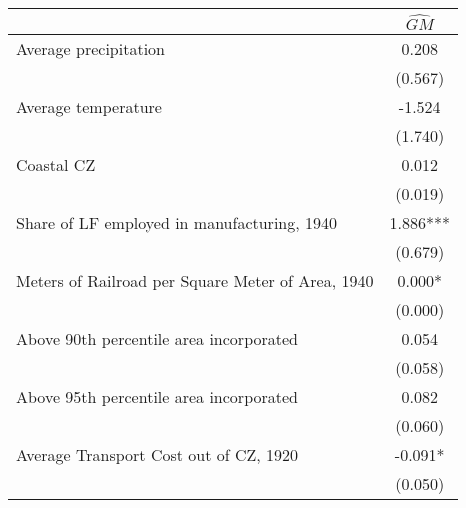  \begin{tabular}{l*{1}{c}} \toprule
                &\multicolumn{1}{c}{$\widehat{GM}$}\\
\midrule
Average precipitation&    0.208   \\
                &  (0.567)   \\
\addlinespace
Average temperature&   -1.524   \\
                &  (1.740)   \\
\addlinespace
Coastal CZ      &    0.012   \\
                &  (0.019)   \\
\addlinespace
Share of LF employed in manufacturing, 1940&    1.886***\\
                &  (0.679)   \\
\addlinespace
Meters of Railroad per Square Meter of Area, 1940&    0.000*  \\
                &  (0.000)   \\
\addlinespace
Above 90th percentile area incorporated&    0.054   \\
                &  (0.058)   \\
\addlinespace
Above 95th percentile area incorporated&    0.082   \\
                &  (0.060)   \\
\addlinespace
Average Transport Cost out of CZ, 1920&   -0.091*  \\
                &  (0.050)   \\
       \bottomrule \end{tabular}

